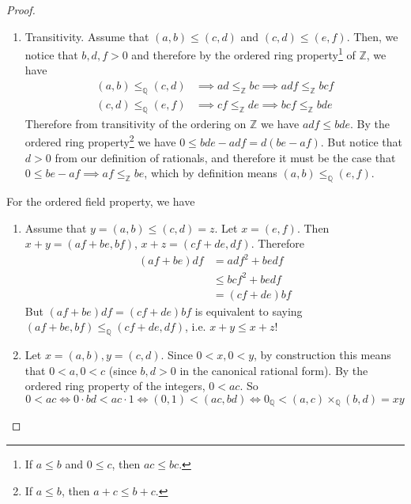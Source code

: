 \begin{proof}
\begin{enumerate}
      \item Transitivity. Assume that $(a, b) \leq (c, d)$ and $(c, d) \leq (e, f)$. Then, we notice that $b, d, f > 0$ and therefore by the ordered ring property\footnote{If $a \leq b$ and $0 \leq c$, then $ac \leq bc$.} of $\mathbb{Z}$, we have 
      \begin{align}
        (a, b) \leq_{\mathbb{Q}} (c, d) & \implies ad \leq_{\mathbb{Z}} bc \implies adf \leq_{\mathbb{Z}} bcf \\ 
        (c, d) \leq_{\mathbb{Q}} (e, f) & \implies cf \leq_{\mathbb{Z}} de \implies bcf \leq_{\mathbb{Z}} bde
      \end{align}
      Therefore from transitivity of the ordering on $\mathbb{Z}$ we have $adf \leq bde$. By the ordered ring property\footnote{If $a \leq b$, then $a + c \leq b + c$.}  we have $0 \leq bde - adf = d(be - af)$. But notice that $d > 0$ from our definition of rationals, and therefore it must be the case that $0 \leq be - af \implies af \leq_{\mathbb{Z}} be$, which by definition means $(a, b) \leq_{\mathbb{Q}} (e, f)$. 
    \end{enumerate}
    For the ordered field property, we have 
    \begin{enumerate}
      \item Assume that $y = (a, b) \leq (c, d) = z$. Let $x = (e, f)$. Then $x + y = (af + be, bf)$, $x + z = (cf + de, df)$. Therefore 
      \begin{align}
        (af + be) df & = adf^2 + bedf \\ 
                     & \leq bcf^2 + bedf \\
                     & = (cf + de) bf
      \end{align} 
      But $(af + be) df = (cf + de) bf$ is equivalent to saying $(af + be, bf) \leq_{\mathbb{Q}} (cf + de, df)$, i.e. $x + y \leq x + z$!  

      \item Let $x = (a, b), y = (c, d)$. Since $0 < x, 0 < y$, by construction this means that $0 < a, 0 < c$ (since $b, d > 0$ in the canonical rational form). By the ordered ring property of the integers, $0 < ac$. So 
      \begin{equation}
        0 < ac \iff 0 \cdot bd < ac \cdot 1 \iff (0, 1) < (ac, bd)  \iff 0_{\mathbb{Q}} < (a, c) \times_{\mathbb{Q}} (b, d) = x y
      \end{equation}
    \end{enumerate}
  \end{proof} 

